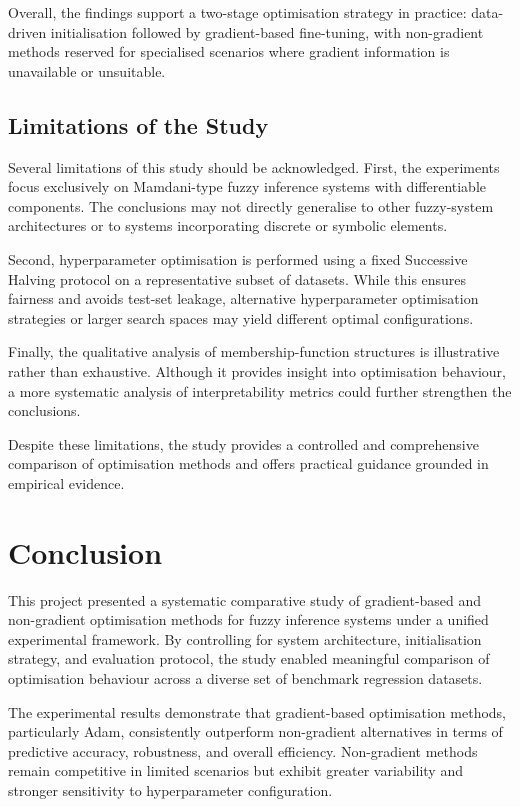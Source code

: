 \documentclass[a4paper,12pt,oneside]{article}
\begin{document}
Overall, the findings support a two-stage optimisation strategy in practice: data-driven initialisation followed by gradient-based fine-tuning, with non-gradient methods reserved for specialised scenarios where gradient information is unavailable or unsuitable.

\subsection{Limitations of the Study}

Several limitations of this study should be acknowledged. First, the experiments focus exclusively on Mamdani-type fuzzy inference systems with differentiable components. The conclusions may not directly generalise to other fuzzy-system architectures or to systems incorporating discrete or symbolic elements.

Second, hyperparameter optimisation is performed using a fixed Successive Halving protocol on a representative subset of datasets. While this ensures fairness and avoids test-set leakage, alternative hyperparameter optimisation strategies or larger search spaces may yield different optimal configurations.

Finally, the qualitative analysis of membership-function structures is illustrative rather than exhaustive. Although it provides insight into optimisation behaviour, a more systematic analysis of interpretability metrics could further strengthen the conclusions.

Despite these limitations, the study provides a controlled and comprehensive comparison of optimisation methods and offers practical guidance grounded in empirical evidence.

\newpage
\section{Conclusion}

This project presented a systematic comparative study of gradient-based and non-gradient optimisation methods for fuzzy inference systems under a unified experimental framework. By controlling for system architecture, initialisation strategy, and evaluation protocol, the study enabled meaningful comparison of optimisation behaviour across a diverse set of benchmark regression datasets.

The experimental results demonstrate that gradient-based optimisation methods, particularly Adam, consistently outperform non-gradient alternatives in terms of predictive accuracy, robustness, and overall efficiency. Non-gradient methods remain competitive in limited scenarios but exhibit greater variability and stronger sensitivity to hyperparameter configuration.
\end{document}
